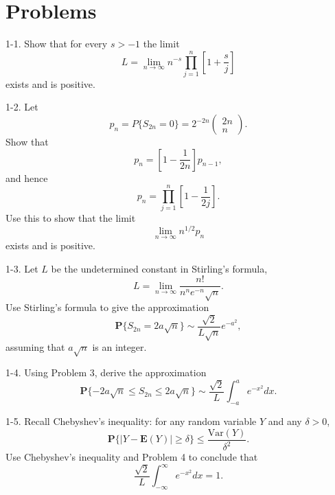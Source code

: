 \documentclass{stml-l}
\theoremstyle{definition}
\numberwithin{equation}{chapter}
\numberwithin{figure}{chapter}
\numberwithin{figure}{section}
\begin{document}
\chapter*{Problems}

1-1. Show that for every $s>-1$ the limit
\begin{equation*}
L=\lim\limits_{n\rightarrow\infty}n^{-s}\prod\limits_{j=1}^{n}\left[1+\frac{s}{j}\right]
\end{equation*}
exists and is positive.

1-2. Let
\begin{equation*}
p_{n}=P\{S_{2n}=0\}=2^{-2n}\left(\begin{matrix}
2n\\
n
\end{matrix}\right).
\end{equation*}
Show that
\begin{equation*}
p_{n}=\left[1-\frac{1}{2n}\right]p_{n-1},
\end{equation*}
and hence
\begin{equation*}
p_{n}=\prod\limits_{j=1}^{n}\left[1-\frac{1}{2j}\right].
\end{equation*}
Use this to show that the limit
\begin{equation*}
\lim\limits_{n\rightarrow\infty}n^{1/2}p_{n}
\end{equation*}
exists and is positive.

1-3. Let $L$ be the undetermined constant in Stirling's formula,
\begin{equation*}
L=\lim\limits_{n\rightarrow\infty}\frac{n!}{n^{n}e^{-n}\sqrt{n}}.
\end{equation*}
Use Stirling's formula to give the approximation
\begin{equation*}
\mathbf{P}\{S_{2n}=2a\sqrt{n}\}\sim\frac{\sqrt{2}}{L\sqrt{n}}e^{-a^{2}},
\end{equation*}
assuming that $a\sqrt{n}$ is an integer.

1-4. Using Problem 3, derive the approximation
\begin{equation*}
\mathbf{P}\{-2a\sqrt{n}\leq S_{2n}\leq
2a\sqrt{n}\}\sim\frac{\sqrt{2}}{L}\int_{-a}^{a}e^{-x^{2}}dx.
\end{equation*}

1-5. Recall Chebyshev's inequality: for any random variable $Y$ and
any $\delta>0$,
\begin{equation*}
\mathbf{P}\{|Y-\mathbf{E}(Y)|\geq\delta\}\leq\frac{\mathrm{Var}(Y)}{\delta^{2}}.
\end{equation*}
Use Chebyshev's inequality and Problem 4 to conclude that
\begin{equation*}
\frac{\sqrt{2}}{L}\int_{-\infty}^{\infty}e^{-x^{2}}dx=1.
\end{equation*}
\end{document}
